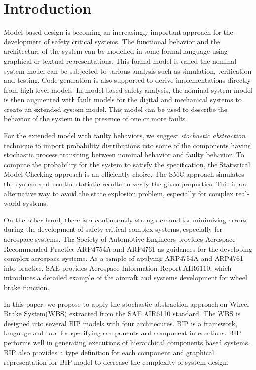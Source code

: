 
\section{Introduction}
Model based design is becoming an increasingly important approach for the development of safety critical systems.
The functional behavior and the architecture of the system can be modelled in some formal language using graphical or textual representations.
This formal model is called the nominal system model can be subjected to various analysis such as simulation, verification and testing.
Code generation is also supported to derive implementations directly from high level models.
In model based safety analysis, the nominal system model is then augmented with fault models for the digital and mechanical systems to create an extended system model.
This model can be used to describe the behavior of the system in the presence of one or more faults.

For the extended model with faulty behaviors, we suggest \emph{stochastic abstraction}\cite{stoabs} technique to import probability distributions into some of the components having stochastic process transiting between nominal behavior and faulty behavior.
To compute the probability for the system to satisfy the specification, the Statistical Model Checking\cite{vmcai04}\cite{cav04}\cite{cmu04} approach is an efficiently choice. The SMC approach simulates the system and use the statistic results to verify the given properties. 
This is an alternative way to avoid the state explosion problem, especially for complex real-world systems.

On the other hand, there is a continuously strong demand for minimizing errors during the development of safety-critical complex systems\cite{lctes10}, especially for aerospace systems\cite{issrew12}.
The Society of Automotive Engineers provides Aerospace Recommended Practice ARP4754A\cite{arp4754a} and ARP4761\cite{arp4761} as guidances for the developing complex aerospace systems. As a sample of applying ARP4754A and ARP4761 into practice, SAE provides Aerospace Information Report AIR6110\cite{air6110}, which introduces a detailed example of the aircraft and systems development for wheel brake function.

In this paper, we propose to apply the stochastic abstraction approach on Wheel Brake System(WBS) extracted from the SAE AIR6110 standard. The WBS is designed into several BIP models with four architecures. BIP is a framework, language and tool for specifying components and component interactions. BIP performs well in generating executions of hierarchical components based systems. BIP also provides a type definition for each component and graphical representation for BIP model to decrease the complexity of system design.

